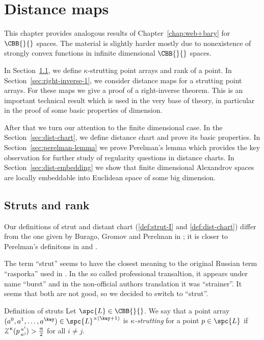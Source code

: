 \chapter{Distance maps %
}\label{chap:dist-maps}

This chapter provides analogous results of Chapter~\ref{chap:web+bary} for $\CBB{}{}$ spaces.
The material is slightly harder mostly due to nonexistence of strongly convex functions in infinite dimensional $\CBB{}{}$ spaces.

In Section~\ref{sec:struts+rank},
we define $\kappa$-strutting point arrays 
and rank of a point.
In Section~\ref{sec:right-inverse-1},
we consider distance maps for a strutting point arrays.
For these maps we give a proof of a right-inverse theorem.
This is an important technical result which is used in the very base of theory, in particular in the proof of some basic properties of dimension.

After that we turn our attention to the finite dimensional case.
In the Section~\ref{sec:dist-chart}, we define distance chart and prove its basic properties.
In Section~\ref{sec:perelman-lemma} we prove Perelman's lemma which provides the key observation for further study of regularity questions in distance charts.
In Section~\ref{sec:dist-embedding} we show that finite dimensional Alexandrov spaces are locally embeddable into Euclidean space of some big dimension.



\section{Struts and rank}\label{sec:struts+rank}

Our definitions of strut 
and distant chart 
(\ref{def:strut-I} and \ref{def:dist-chart}) 
differ from the one 
given by 
Burago, 
Gromov 
and Perelman in \cite{BGP};
it is closer to Perelman's definitons in \cite{perelman:spaces2} %
and \cite{perelman:morse}%
.

The term ``strut'' seems to have the closest meaning to the original Russian term ``rasporka''%
 used in \cite{BGP}.
In the so called professional transaltion,
it appears under name ``burst'' 
and in the non-official authors translation it was ``strainer''.
It seems that both are not good, 
so we decided to switch to ``strut''.

\begin{thm}{Definition of struts}\label{def:strut-I}
Let $\spc{L}\in\CBB{}{}$.
We say that a point array $(a^0,a^1,\dots,a^\kay)\in\spc{L}^{{\times}(\kay+1)}$
 is \emph{$\kappa$-strutting} for a point $p\in\spc{L}$ if $\angk\kappa p {a^i}{a^j}>\tfrac\pi2$ for all $i\not=j$.
\end{thm} 




